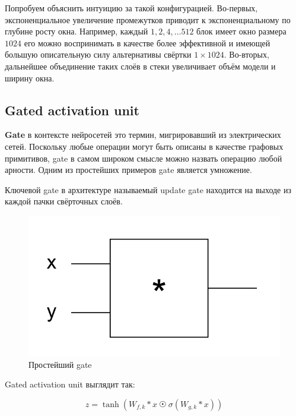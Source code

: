 \documentclass[../diploma.tex]{subfiles}
\begin{document}
Попробуем объяснить интуицию за такой конфигурацией. Во-первых, экспоненциальное увеличение промежутков приводит к экспоненциальному по глубине росту окна. \cite{arxiv:yu-fisher} Например, каждый $1,2,4, \dots 512$ блок имеет окно размера $1024$ его можно воспринимать в качестве более эффективной и имеющей большую описательную силу альтернативы свёртки $1 \times 1024$. Во-вторых, дальнейшее объединение таких слоёв в стеки увеличивает объём модели и ширину окна.

\newpage
\subsection{Gated activation unit}

\begin{definition}
\textbf{Gate} в контексте нейросетей это термин, мигрировавший из электрических сетей. Поскольку любые операции могут быть описаны в качестве графовых примитивов, gate в самом широком смысле можно назвать операцию любой арности. Одним из простейших примеров gate является умножение.

Ключевой gate в архитектуре называемый update gate находится на выходе из каждой пачки свёрточных слоёв.

\begin{figure}[ht!]
  \centering
  \includegraphics[scale=0.35]{img/gate}
  \caption{Простейший gate}
  \label{fig:gate}
\end{figure}

\end{definition}

Gated activation unit выглядит так:

\begin{equation} \label{eq:activation_func}
z = \tanh(W_{f,k} * x \  \astrosun \  \sigma(W_{g,k} * x))
\end{equation}
\end{document}
